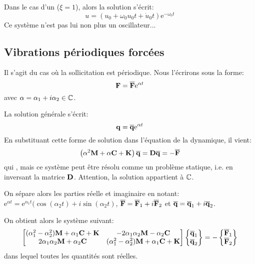 \medskip
Dans le cas d'un  ($\xi=1$), alors la solution s'écrit:
\begin{equation}
u = (u_0+\omega_0u_0t+\dot{u}_0t)\mathrm{e}^{-\omega_0 t}
\end{equation}
Ce système n'est pas lui non plus un oscillateur...




\medskip{}
\subsection{Vibrations périodiques forcées}
Il s'agit du cas où la sollicitation est périodique. Nous l'écrirons sous la forme:
\begin{equation} \VV{F}=\VV{\overline{F}}\mathrm{e}^{\alpha t} \end{equation}
avec $\alpha=\alpha_1+i\alpha_2\in\mathbb C$.

La solution générale s'écrit:
\begin{equation} \VV{q}=\VV{\overline{q}}\mathrm{e}^{\alpha t} \end{equation}
En substituant cette forme de solution dans l'équation de la dynamique, il vient:
\begin{equation} \left(\alpha^2\MM{M}+\alpha\MM{C}+\MM{K}\right)\VV{\overline{q}}=\MM{D}\VV{\overline{q}}=-\VV{\overline{F}} \end{equation}
qui , mais ce système peut être résolu
comme un problème statique, i.e. en inversant la matrice $\MM{D}$. Attention, la solution appartient à $\mathbb C$.

\medskip
On sépare alors les parties réelle et imaginaire en notant:
$\mathrm{e}^{\alpha t}=\mathrm{e}^{\alpha_1 t}(\cos(\alpha_2 t)+i\sin(\alpha_2 t)$, $\VV{\overline{F}}=\VV{\overline{F}}_1
+i\VV{\overline{F}}_2$ et $\VV{\overline{q}}=\VV{\overline{q}}_1+i\VV{\overline{q}}_2$.

On obtient alors le système suivant:
\begin{equation}
\MM*{(\alpha_1^2-\alpha_2^2)\MM{M}+\alpha_1\MM{C}+\MM{K} & -2\alpha_1\alpha_2\MM{M}-\alpha_2\MM{C}\\
2\alpha_1\alpha_2\MM{M}+\alpha_2\MM{C} & (\alpha_1^2-\alpha_2^2)\MM{M}+\alpha_1\MM{C}+\MM{K}}
\VV*{\VV{\overline{q}}_1\\ \VV{\overline{q}}_2}
=
-\VV*{\VV{\overline{F}}_1\\ \VV{\overline{F}}_2}
\end{equation}
dans lequel toutes les quantités sont réelles.

